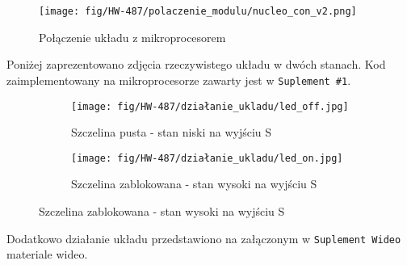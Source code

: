 \documentclass[11pt, a4paper]{article}
\begin{document}
\vspace{0.25cm}
\begin{figure}[h]
    \centering
    \texttt{[image: fig/HW-487/polaczenie\_modulu/nucleo\_con\_v2.png]}
    \caption{Połączenie układu z mikroprocesorem}
    \label{fig:_polaczenie_ukladu}
\end{figure}
\vspace{0.25cm}

Poniżej zaprezentowano zdjęcia rzeczywistego układu w dwóch stanach. Kod zaimplementowany na mikroprocesorze zawarty jest w \texttt{Suplement \#1}.

\vspace{0.25cm}
\begin{figure}[h]
\centering
\begin{subfigure}{.5\textwidth}
\centering
\texttt{[image: fig/HW-487/działanie\_ukladu/led\_off.jpg]}
\caption{Szczelina pusta - stan niski na wyjściu S}
\label{fig:_uklad_off}
\end{subfigure}%
\begin{subfigure}{.5\textwidth}
\centering
\texttt{[image: fig/HW-487/działanie\_ukladu/led\_on.jpg]}
\caption{Szczelina zablokowana - stan wysoki na wyjściu S}
\label{fig:_uklad_on}
\end{subfigure}
\label{fig:mikroproc}
\end{figure}
\vspace{0.25cm}
Dodatkowo działanie układu przedstawiono na załączonym w \texttt{Suplement Wideo} materiale 
wideo.

\newpage
\printbibliography[heading=bibintoc]
\end{document}
